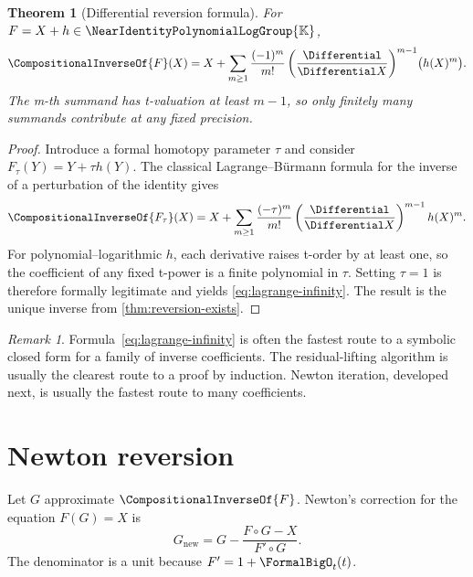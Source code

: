 \documentclass[11pt,openany]{book}
\theoremstyle{definition}
\theoremstyle{plain}
\newtheorem{theorem}{Theorem}[chapter]
\theoremstyle{remark}
\newtheorem{remark}{Remark}[chapter]
\newcommand{\K}{\mathbb{K}}
\newcommand{\rev}[1]{\CompositionalInverseOf{#1}}
\newcommand{\compose}{\mathbin{\circ}}
\begin{document}
\begin{theorem}[Differential reversion formula]\label{thm:lagrange-infinity}
For \(F=X+h\in\NearIdentityPolynomialLogGroup{\K}\),
\begin{equation}\label{eq:lagrange-infinity}
 \rev{F}(X)
 =X+\sum_{m\ge1}\frac{(-1)^m}{m!}
 \left(\frac{\Differential}{\Differential X}\right)^{m-1}\!\bigl(h(X)^m\bigr).
\end{equation}
The m-th summand has t-valuation at least \(m-1\), so only finitely many
summands contribute at any fixed precision.
\end{theorem}
\begin{proof}
Introduce a formal homotopy parameter \(\tau\) and consider
\(F_\tau(Y)=Y+\tau h(Y)\).  The classical Lagrange--Bürmann formula for the inverse
of a perturbation of the identity gives
\[
 \CompositionalInverseOf{F_\tau}(X)
 =X+\sum_{m\ge1}\frac{(-\tau)^m}{m!}
 \left(\frac{\Differential}{\Differential X}\right)^{m-1}h(X)^m.
\]
For polynomial--logarithmic \(h\), each derivative raises t-order by at least
one, so the coefficient of any fixed t-power is a finite polynomial in \(\tau\).
Setting \(\tau=1\) is therefore formally legitimate and yields
\cref{eq:lagrange-infinity}.  The result is the unique inverse from
\cref{thm:reversion-exists}.
\end{proof}

\begin{remark}
Formula~\eqref{eq:lagrange-infinity} is often the fastest route to a symbolic
closed form for a family of inverse coefficients.  The residual-lifting
algorithm is usually the clearest route to a proof by induction.  Newton
iteration, developed next, is usually the fastest route to many coefficients.
\end{remark}

\section{Newton reversion}
Let \(G\) approximate \(\rev{F}\).  Newton's correction for the equation
\(F(G)=X\) is
\begin{equation}\label{eq:newton-reversion}
 G_{\mathrm{new}}
 =G-\frac{F\compose G-X}{F'\compose G}.
\end{equation}
The denominator is a unit because \(F'=1+\FormalBigO_t(t)\).
\end{document}
